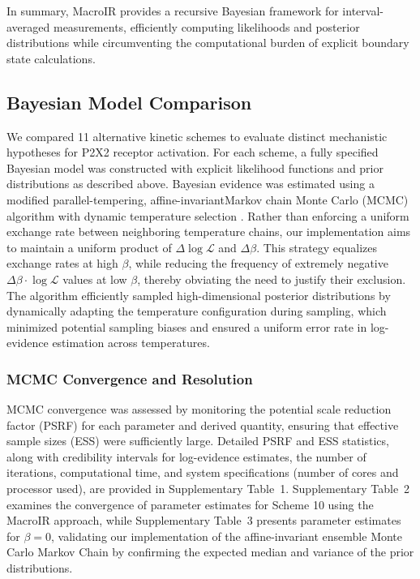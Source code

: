 \documentclass[9pt]{elife}
\begin{document}
	In summary, MacroIR provides a recursive Bayesian framework for interval-averaged measurements, efficiently computing likelihoods and posterior distributions while circumventing the computational burden of explicit boundary state calculations.
	
	\subsection{Bayesian Model Comparison}  
	We compared 11 alternative kinetic schemes to evaluate distinct mechanistic hypotheses for P2X2 receptor activation. For each scheme, a fully specified Bayesian model was constructed with explicit likelihood functions and prior distributions as described above. Bayesian evidence was estimated using a modified parallel-tempering, affine-invariant\cite{goodman2010ensemble}Markov chain Monte Carlo (MCMC) algorithm  with dynamic temperature selection \cite{vousden2016dynamic}. Rather than enforcing a uniform exchange rate between neighboring temperature chains, our implementation aims to maintain a uniform product of $\Delta\log\mathcal{L}$ and $\Delta\beta$. This strategy equalizes exchange rates at high $\beta$, while reducing the frequency of extremely negative $\Delta\beta\cdot\log\mathcal{L}$ values at low $\beta$, thereby obviating the need to justify their exclusion. The algorithm efficiently sampled high-dimensional posterior distributions by dynamically adapting the temperature configuration during sampling, which minimized potential sampling biases and ensured a uniform error rate in log-evidence estimation across temperatures.
	
	\subsubsection{MCMC Convergence and Resolution}  
	MCMC convergence was assessed by monitoring the potential scale reduction factor (PSRF) for each parameter and derived quantity, ensuring that effective sample sizes (ESS) were sufficiently large. Detailed PSRF and ESS statistics, along with credibility intervals for log-evidence estimates, the number of iterations, computational time, and system specifications (number of cores and processor used), are provided in Supplementary Table~1. Supplementary Table~2 examines the convergence of parameter estimates for Scheme 10 using the MacroIR approach, while Supplementary Table~3 presents parameter estimates for \(\beta=0\), validating our implementation of the affine-invariant ensemble Monte Carlo Markov Chain by confirming the expected median and variance of the prior distributions.
\end{document}
